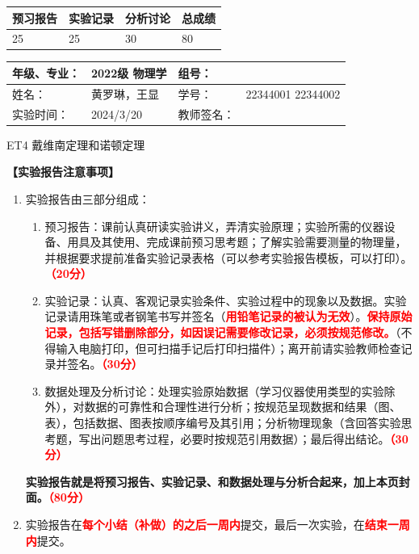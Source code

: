 \documentclass[dvipsnames, svgnames,a4paper,11pt]{article}
\begin{document}
	
	\begin{table}
		\renewcommand\arraystretch{1.7}
		\begin{tabularx}{\textwidth}{
				|X|X|X|X
				|X|X|X|X|}
			\hline
			\multicolumn{2}{|c|}{预习报告}&\multicolumn{2}{|c|}{实验记录}&\multicolumn{2}{|c|}{分析讨论}&\multicolumn{2}{|c|}{总成绩}\\
			\hline
			\LARGE25 & & \LARGE25 & & \LARGE30 & & \LARGE80 & \\
			\hline
		\end{tabularx}
	\end{table}
	
		\begin{table}
		\renewcommand\arraystretch{1.7}
		\begin{tabularx}{\textwidth}{|X|X|X|X|}
			\hline
			年级、专业： & 2022级 物理学 &组号： & \\
			\hline
			姓名： &  黄罗琳，王显  & 学号： &22344001 22344002   \\
			\hline
			实验时间： & 2024/3/20 & 教师签名： & \\
			\hline
		\end{tabularx}
	\end{table}
	
	\begin{center}
	\LARGE ET4 \quad 戴维南定理和诺顿定理
	\end{center}
	
	
	\textbf{【实验报告注意事项】}
	\begin{enumerate}
		\item 实验报告由三部分组成：
		\begin{enumerate}
			\item 预习报告：课前认真研读实验讲义，弄清实验原理；实验所需的仪器设备、用具及其使用、完成课前预习思考题；了解实验需要测量的物理量，并根据要求提前准备实验记录表格（可以参考实验报告模板，可以打印）。\textcolor{red}{\textbf{（20分）}}
			\item 实验记录：认真、客观记录实验条件、实验过程中的现象以及数据。实验记录请用珠笔或者钢笔书写并签名（\textcolor{red}{\textbf{用铅笔记录的被认为无效}}）。\textcolor{red}{\textbf{保持原始记录，包括写错删除部分，如因误记需要修改记录，必须按规范修改。}}（不得输入电脑打印，但可扫描手记后打印扫描件）；离开前请实验教师检查记录并签名。\textcolor{red}{\textbf{（30分）}}
			\item 数据处理及分析讨论：处理实验原始数据（学习仪器使用类型的实验除外），对数据的可靠性和合理性进行分析；按规范呈现数据和结果（图、表），包括数据、图表按顺序编号及其引用；分析物理现象（含回答实验思考题，写出问题思考过程，必要时按规范引用数据）；最后得出结论。\textcolor{red}{\textbf{（30分）}}
		\end{enumerate}
		\textbf{实验报告就是将预习报告、实验记录、和数据处理与分析合起来，加上本页封面。\textcolor{red}{（80分）}}
		\item 实验报告在\textcolor{red}{\textbf{每个小结（补做）的之后一周内}}提交，最后一次实验，在\textcolor{red}{\textbf{结束一周内}}提交。
		
	\end{enumerate}
	
\end{document}
